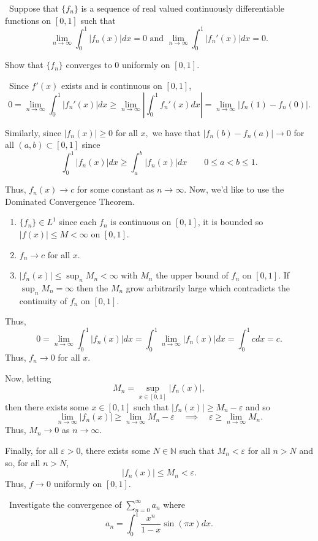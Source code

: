 \documentclass[12pt]{Qual}
\begin{document}
\begin{problem} $\,$
Suppose that $\{f_n\}$ is a sequence of real valued continuously differentiable functions on $[0,1]$ such that $$\lim_{n\to\infty}\int_0^1|f_n(x)|dx=0\text{ and }\lim_{n\to\infty}\int_0^1|f_n'(x)|dx=0.$$

Show that $\{f_n\}$ converges to $0$ uniformly on $[0,1]$.
\end{problem}


\begin{solution}$\,$
Since $f'(x)$ exists and is continuous on $[0,1]$, $$0=\lim_{n\to\infty}\int_0^1|f_n'(x)|dx\ge\lim_{n\to\infty}\left|\int_0^1f_n'(x)dx\right|=\lim_{n\to\infty}|f_n(1)-f_n(0)|.$$

Similarly, since $|f_n(x)|\ge0$ for all $x,$ we have that $|f_n(b)-f_n(a)|\to0$ for all $(a,b)\subset[0,1]$ since $$\int_0^1|f_n(x)|dx\ge\int_a^b|f_n(x)|dx\qquad 0\le a< b\le 1.$$

Thus, $f_n(x)\to c$ for some constant as $n\to\infty$. Now, we'd like to use the Dominated Convergence Theorem.
\begin{enumerate}
    \item $\{f_n\}\in L^1$ since each $f_n$ is continuous on $[0,1]$, it is bounded so $|f(x)|\le M<\infty$ on $[0,1]$.
    \item $f_n\to c$ for all $x$.
    \item $|f_n(x)|\le \sup_n M_n<\infty$ with $M_n$ the upper bound of $f_n$ on $[0,1]$. If $\sup_n M_n=\infty$ then the $M_n$ grow arbitrarily large which contradicts the continuity of $f_n$ on $[0,1]$.
\end{enumerate}

Thus, $$0=\lim_{n\to\infty}\int_0^1|f_n(x)|dx=\int_0^1\lim_{n\to\infty}|f_n(x)|dx=\int_0^1cdx=c.$$ Thus, $f_n\to 0$ for all $x$.

Now, letting $$M_n=\sup_{x\in[0,1]}|f_n(x)|,$$ then there exists some $x\in[0,1]$ such that $|f_n(x)|\ge M_n-\varepsilon$ and so $$\lim_{n\to\infty}|f_n(x)|\ge\lim_{n\to\infty}M_n-\varepsilon\quad\implies\quad\varepsilon\ge\lim_{n\to\infty}M_n.$$ Thus, $M_n\to0$ as $n\to\infty$.

Finally, for all $\varepsilon>0$, there exists some $N\in\mathbb{N}$ such that $M_n<\varepsilon$ for all $n>N$ and so, for all $n> N$, $$|f_n(x)|\le M_n<\varepsilon.$$ Thus, $f\to0$ uniformly on $[0,1]$.
\end{solution}
\newpage

\begin{problem} $\,$
Investigate the convergence of $\sum_{n=0}^\infty a_n$ where $$a_n=\int_0^1\frac{x^n}{1-x}\sin(\pi x)dx.$$
\end{problem}
\end{document}
